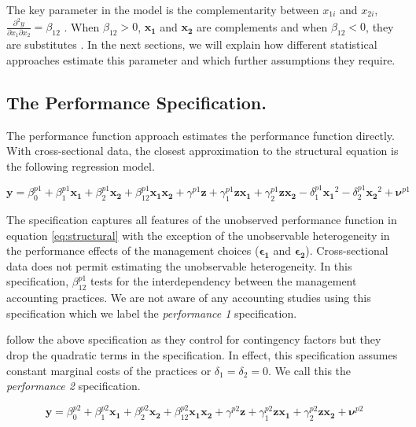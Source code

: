 \documentclass[12pt]{article}
\begin{document}
The key parameter in the model is the complementarity between \(x_{1i}\)
and \(x_{2i}\),
\(\frac{ \partial^2 y}{\partial x_1 \partial x_2} = \beta_{12}\) . When
\(\beta_{12} > 0\), \(\mathbf{x_1}\) and \(\mathbf{x_2}\) are
complements and when \(\beta_{12} < 0\), they are substitutes
\citep{Milgrom1995}. In the next sections, we will explain how different
statistical approaches estimate this parameter and which further
assumptions they require.

\subsection{The Performance
Specification.}\label{the-performance-specification.}

The performance function approach estimates the performance function
directly. With cross-sectional data, the closest approximation to the
structural equation is the following regression model.

\[
\mathbf{y} = \beta^{p1}_0 + \beta^{p1}_1 \mathbf{x_1} + \beta^{p1}_2 \mathbf{x_2}
  + \beta^{p1}_{12} \mathbf{x_1} \mathbf{x_2} + \gamma^{p1} \mathbf{z} +
  \gamma^{p1}_{1} \mathbf{z} \mathbf{x_1} +
  \gamma^{p1}_{2} \mathbf{z} \mathbf{x_2} -
  \delta^{p1}_1 \mathbf{x_1}^2 - \delta^{p1}_2 \mathbf{x_2}^2  +
  \mathbf{\nu}^{p1}
\]

The specification captures all features of the unobserved performance
function in equation \eqref{eq:structural} with the exception of the
unobservable heterogeneity in the performance effects of the management
choices (\(\mathbf{\epsilon_1}\) and \(\mathbf{\epsilon_2}\)).
Cross-sectional data does not permit estimating the unobservable
heterogeneity. In this specification, \(\beta_{12}^{p1}\) tests for the
interdependency between the management accounting practices. We are not
aware of any accounting studies using this specification which we label
the \emph{performance 1} specification.

\citet{Bedford2016} follow the above specification as they control for
contingency factors but they drop the quadratic terms in the
specification. In effect, this specification assumes constant marginal
costs of the practices or \(\delta_1 = \delta_2 = 0\). We call this the
\emph{performance 2} specification.

\[
\mathbf{y} = \beta^{p2}_0 + \beta^{p2}_1 \mathbf{x_1} + \beta^{p2}_2 \mathbf{x_2}
  + \beta^{p2}_{12} \mathbf{x_1} \mathbf{x_2} + \gamma^{p2} \mathbf{z} +
  \gamma^{p2}_{1} \mathbf{z} \mathbf{x_1} +
  \gamma^{p2}_{2} \mathbf{z} \mathbf{x_2} +
  \mathbf{\nu}^{p2}
\]
\end{document}
